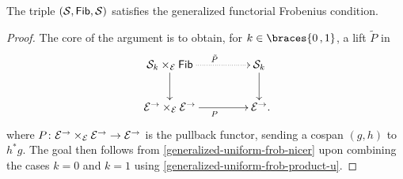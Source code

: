 \documentclass[reqno,10pt,a4paper,oneside,draft]{amsart}
\begin{document}
{{\begin{lemma} \label{technical}
The triple $(\mathcal{S}, \mathsf{Fib}, \mathcal{S})$ satisfies the generalized functorial Frobenius condition.
\end{lemma}

\begin{proof}
The core of the argument is to obtain, for $k \in \braces{0\,, 1}$, a lift $\tilde{P}$ in
\begin{equation} \label{strong-h-equiv-uniform-base-change:goal}
\begin{gathered}
\xymatrix@C+2em{
  \cal{S}_k \times_{\cal{E}} \Fib
  \ar@{.>}[r]^{\tilde{P}}
  \ar[d]
&
  \cal{S}_k
  \ar[d]
\\
  \cal{E}^\to \times_{\cal{E}} \cal{E}^\to
  \ar[r]_{P}
&
  \cal{E}^\to
\rlap{.}}
\end{gathered}
\end{equation}
where $P \colon \mathcal{E}^\to \times_{\mathcal{E}} \mathcal{E}^\to \to \mathcal{E}^\to$ is the pullback functor, sending a cospan $(g, h)$ to $h^* g$.
The goal then follows from \cref{generalized-uniform-frob-nicer} upon combining the cases $k = 0$ and $k = 1$ using \cref{generalized-uniform-frob-product-u}.


\end{proof}}}
\end{document}
